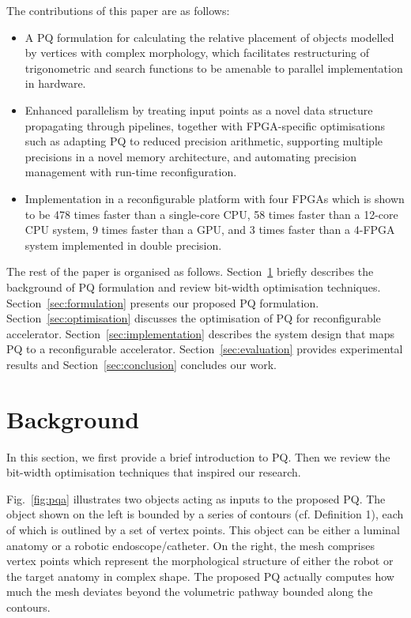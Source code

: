 The contributions of this paper are as follows:
\begin{itemize}
\item A PQ formulation for calculating the relative placement of objects modelled by vertices with complex morphology, which facilitates
restructuring of trigonometric and search functions to be amenable to parallel implementation in hardware.
\item Enhanced parallelism by treating input points as a novel data structure propagating through pipelines, 
together with FPGA-specific optimisations such as adapting PQ to reduced precision arithmetic,
supporting multiple precisions in a novel memory architecture, and automating precision management with run-time reconfiguration.
\item Implementation in a reconfigurable platform with four FPGAs which is shown to be 478 times faster than a single-core CPU, 58 times faster than a 12-core CPU system, 9 times faster than a GPU, and 3 times faster than a 4-FPGA system implemented in double precision.
\end{itemize}

The rest of the paper is organised as follows.
Section~\ref{sec:bg} briefly describes the background of PQ formulation and review bit-width optimisation techniques.
Section~\ref{sec:formulation} presents our proposed PQ formulation.
Section~\ref{sec:optimisation} discusses the optimisation of PQ for reconfigurable accelerator.
Section~\ref{sec:implementation} describes the system design that maps PQ to a reconfigurable accelerator.
Section~\ref{sec:evaluation} provides experimental results and
Section~\ref{sec:conclusion} concludes our work.

\section{Background}
\label{sec:bg}

In this section, we first provide a brief introduction to PQ.
Then we review the bit-width optimisation techniques that inspired our research.

Fig.~\ref{fig:pqa} illustrates two objects acting as inputs to the proposed PQ. 
The object shown on the left is bounded by a series of contours (cf. Definition 1), each of which is outlined by a set of vertex points. 
This object can be either a luminal anatomy or a robotic endoscope/catheter. 
On the right, the mesh comprises vertex points which represent the morphological structure of either the robot or the target anatomy in complex shape. 
The proposed PQ actually computes how much the mesh deviates beyond the volumetric pathway bounded along the contours.

